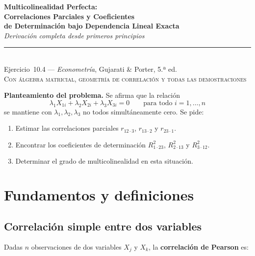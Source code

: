 \documentclass[12pt, letterpaper]{article}
\theoremstyle{remark}
\newcommand{\rp}[2]{r_{#1 \cdot #2}}   %
\newcommand{\Rd}[2]{R^2_{#1 \cdot #2}} %
\begin{document}
\begin{center}
  {\LARGE\bfseries Multicolinealidad Perfecta:}\\[6pt]
  {\LARGE\bfseries Correlaciones Parciales y Coeficientes}\\
  {\LARGE\bfseries de Determinación bajo Dependencia Lineal Exacta}\\[12pt]
  {\large\itshape Derivación completa desde primeros principios}\\[14pt]
  \rule{0.55\linewidth}{0.6pt}\\[8pt]
  {\normalsize Ejercicio~10.4 — \textit{Econometría}, Gujarati \& Porter, 5.ª ed.}\\[4pt]
  {\small\textsc{Con álgebra matricial, geometría de correlación y todas las demostraciones}}
\end{center}

\vspace{10pt}

\noindent\textbf{Planteamiento del problema.}\quad
Se afirma que la relación
\begin{equation}
  \lambda_1 X_{1i} + \lambda_2 X_{2i} + \lambda_3 X_{3i} = 0
  \qquad \text{para todo } i = 1, \ldots, n
  \label{eq:relacion}
\end{equation}
se mantiene con $\lambda_1, \lambda_2, \lambda_3$ no todos simultáneamente cero.
Se pide:
\begin{enumerate}[label=(\alph*), itemsep=3pt]
  \item Estimar las correlaciones parciales $\rp{12}{3}$, $\rp{13}{2}$ y $\rp{23}{1}$.
  \item Encontrar los coeficientes de determinación $\Rd{1}{23}$, $\Rd{2}{13}$ y $\Rd{3}{12}$.
  \item Determinar el grado de multicolinealidad en esta situación.
\end{enumerate}

\section{Fundamentos y definiciones}

\subsection{Correlación simple entre dos variables}

Dadas $n$ observaciones de dos variables $X_j$ y $X_k$, la \textbf{correlación
de Pearson} es:
\end{document}
